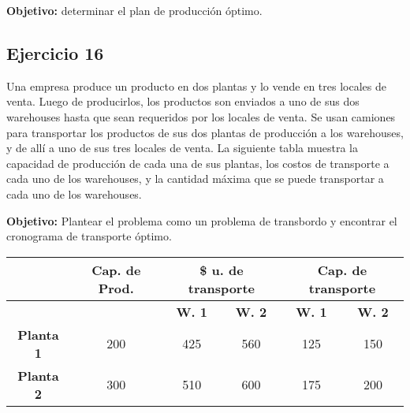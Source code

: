 \documentclass[12pt]{article}
\begin{document}
\vspace{0.3em}

\textbf{Objetivo:} determinar el plan de producción óptimo.

\begin{center}
\end{center}

\subsection*{Ejercicio 16}

Una empresa produce un producto en dos plantas y lo vende en tres locales de venta. Luego de producirlos, los productos son enviados a uno de sus dos warehouses hasta que sean requeridos por los locales de venta. Se usan camiones para transportar los productos de sus dos plantas de producción a los warehouses, y de allí a uno de sus tres locales de venta. La siguiente tabla muestra la capacidad de producción de cada una de sus plantas, los costos de transporte a cada uno de los warehouses, y la cantidad máxima que se puede transportar a cada uno de los warehouses.

\vspace{0.3em}

\textbf{Objetivo:} Plantear el problema como un problema de transbordo y encontrar el cronograma de transporte óptimo.

\begin{center}
\begin{tabular}{c|c|cc|cc}
\hline
& \textbf{Cap. de Prod.} & \multicolumn{2}{c|}{\textbf{\$ u. de transporte}} & \multicolumn{2}{c}{\textbf{Cap. de transporte}} \\
\hline
& & \textbf{W. 1} & \textbf{W. 2} & \textbf{W. 1} & \textbf{W. 2} \\
\hline
\textbf{Planta 1} & 200 & 425 & 560 & 125 & 150 \\
\textbf{Planta 2} & 300 & 510 & 600 & 175 & 200 \\
\hline
\end{tabular}
\end{center}
\end{document}
